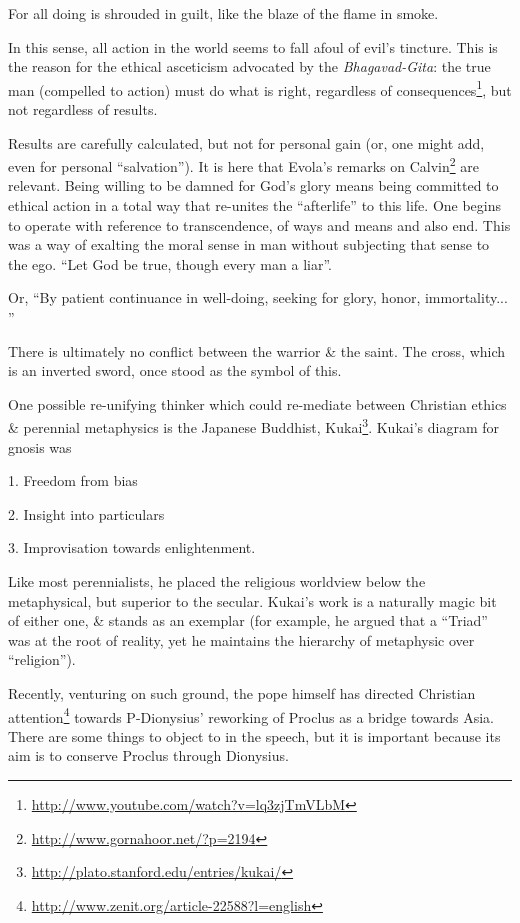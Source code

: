 \begin{quotex}
For all doing is shrouded in guilt, like the blaze of the flame in smoke.
\end{quotex}


In this sense, all action in the world seems to fall afoul of evil's tincture. This is the reason for the ethical asceticism advocated by the \emph{Bhagavad-Gita}: the true man (compelled to action) must do what is right, regardless of consequences\footnote{\url{http://www.youtube.com/watch?v=lq3zjTmVLbM}}, but not regardless of results.

Results are carefully calculated, but not for personal gain (or, one might add, even for personal ``salvation''). It is here that Evola's remarks on Calvin\footnote{\url{http://www.gornahoor.net/?p=2194}} are relevant. Being willing to be damned for God's glory means being committed to ethical action in a total way that re-unites the ``afterlife'' to this life. One begins to operate with reference to transcendence, of ways and means and also end. This was a way of exalting the moral sense in man without subjecting that sense to the ego. ``Let God be true, though every man a liar''.

Or, ``By patient continuance in well-doing, seeking for glory, honor, immortality... ''

There is ultimately no conflict between the warrior \& the saint. The cross, which is an inverted sword, once stood as the symbol of this.

One possible re-unifying thinker which could re-mediate between Christian ethics \& perennial metaphysics is the Japanese Buddhist, Kukai\footnote{\url{http://plato.stanford.edu/entries/kukai/}}. Kukai's diagram for gnosis was

\begin{quotex}
1. Freedom from bias

2. Insight into particulars

3. Improvisation towards enlightenment.
\end{quotex}


Like most perennialists, he placed the religious worldview below the metaphysical, but superior to the secular. Kukai's work is a naturally magic bit of either one, \& stands as an exemplar (for example, he argued that a ``Triad'' was at the root of reality, yet he maintains the hierarchy of metaphysic over ``religion'').

Recently, venturing on such ground, the pope himself has directed Christian attention\footnote{\url{http://www.zenit.org/article-22588?l=english}} towards P-Dionysius' reworking of Proclus as a bridge towards Asia. There are some things to object to in the speech, but it is important because its aim is to conserve Proclus through Dionysius.

